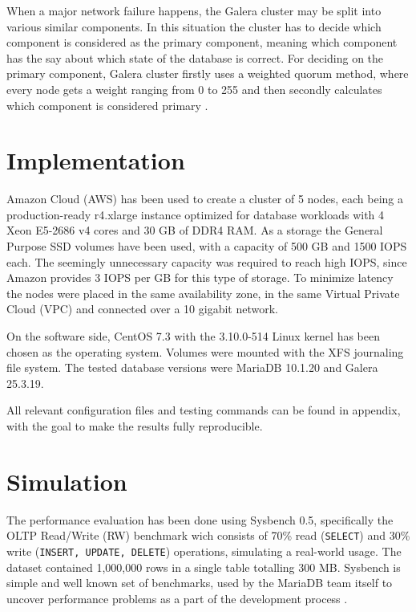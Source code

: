\documentclass{sig-alternate}
\begin{document}
When a major network failure happens, the Galera cluster may be split into various similar components. In this situation the cluster has to decide which component is considered as the primary component, meaning which component has the say about which state of the database is correct. For deciding on the primary component, Galera cluster firstly uses a weighted quorum method, where every node gets a weight ranging from 0 to 255 and then secondly calculates which component is considered primary \cite{galeraquorum}.

\section{Implementation}
Amazon Cloud (AWS) has been used to create a cluster of 5 nodes, each being a production-ready r4.xlarge instance optimized for database workloads \cite{awsinstances} with 4 Xeon E5-2686 v4 cores and 30 GB of DDR4 RAM. As a storage the General Purpose SSD volumes have been used, with a capacity of 500 GB and 1500 IOPS each. The seemingly unnecessary capacity was required to reach high IOPS, since Amazon provides 3 IOPS per GB for this type of storage. To minimize latency the nodes were placed in the same availability zone, in the same Virtual Private Cloud (VPC) and connected over a 10 gigabit network.

On the software side, CentOS 7.3 with the 3.10.0-514 Linux kernel has been chosen as the operating system. Volumes were mounted with the XFS journaling file system. The tested database versions were MariaDB 10.1.20 and Galera 25.3.19.

All relevant configuration files and testing commands can be found in appendix, with the goal to make the results fully reproducible.

\section{Simulation}

The performance evaluation has been done using Sysbench 0.5, specifically the OLTP Read/Write (RW) benchmark wich consists of 70\% read (\texttt{SELECT}) and 30\% write (\texttt{INSERT, UPDATE, DELETE}) operations, simulating a real-world usage. The dataset contained 1,000,000 rows in a single table totalling 300 MB. Sysbench is simple and well known set of benchmarks, used by the MariaDB team itself to uncover performance problems as a part of the development process \cite{mariadbsysbench}.
\end{document}
